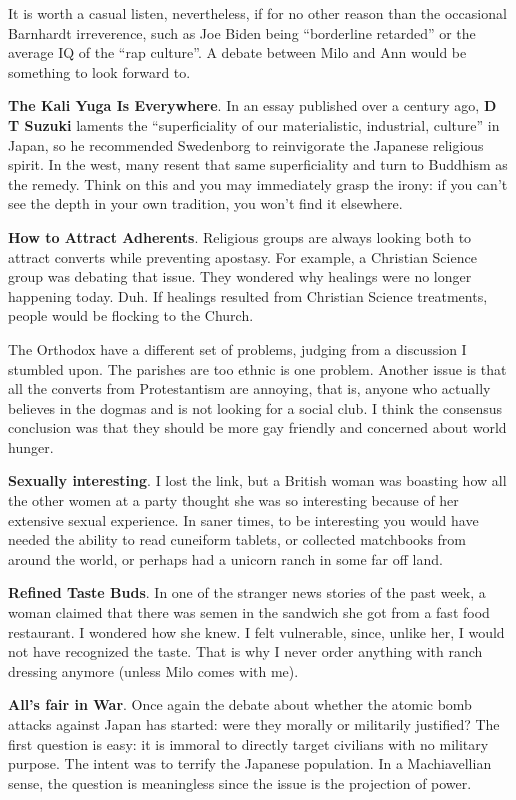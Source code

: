 It is worth a casual listen, nevertheless, if for no other reason than the occasional Barnhardt irreverence, such as Joe Biden being ``borderline retarded'' or the average IQ of the ``rap culture''. A debate between Milo and Ann would be something to look forward to.

\textbf{The Kali Yuga Is Everywhere}. In an essay published over a century ago, \textbf{D T Suzuki} laments the ``superficiality of our materialistic, industrial, culture'' in Japan, so he recommended Swedenborg to reinvigorate the Japanese religious spirit. In the west, many resent that same superficiality and turn to Buddhism as the remedy. Think on this and you may immediately grasp the irony: if you can't see the depth in your own tradition, you won't find it elsewhere.

\textbf{How to Attract Adherents}. Religious groups are always looking both to attract converts while preventing apostasy. For example, a Christian Science group was debating that issue. They wondered why healings were no longer happening today. Duh. If healings resulted from Christian Science treatments, people would be flocking to the Church.

The Orthodox have a different set of problems, judging from a discussion I stumbled upon. The parishes are too ethnic is one problem. Another issue is that all the converts from Protestantism are annoying, that is, anyone who actually believes in the dogmas and is not looking for a social club. I think the consensus conclusion was that they should be more gay friendly and concerned about world hunger.

\textbf{Sexually interesting}. I lost the link, but a British woman was boasting how all the other women at a party thought she was so interesting because of her extensive sexual experience. In saner times, to be interesting you would have needed the ability to read cuneiform tablets, or collected matchbooks from around the world, or perhaps had a unicorn ranch in some far off land.

\textbf{Refined Taste Buds}. In one of the stranger news stories of the past week, a woman claimed that there was semen in the sandwich she got from a fast food restaurant. I wondered how she knew. I felt vulnerable, since, unlike her, I would not have recognized the taste. That is why I never order anything with ranch dressing anymore (unless Milo comes with me).

\textbf{All's fair in War}. Once again the debate about whether the atomic bomb attacks against Japan has started: were they morally or militarily justified? The first question is easy: it is immoral to directly target civilians with no military purpose. The intent was to terrify the Japanese population. In a Machiavellian sense, the question is meaningless since the issue is the projection of power.

